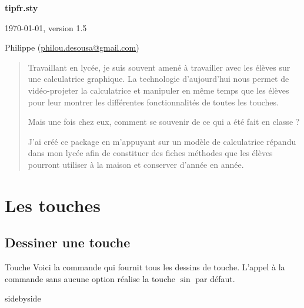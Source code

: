 \documentclass[10pt,french,a4paper]{article}
\begin{document}
\thispagestyle{empty}

\begin{center}
    \begin{tcolorbox}[enhanced,lifted shadow={1mm}{-2mm}{3mm}{0.1mm}{black!50!white},width=0.65\linewidth]
    \Huge\bfseries\centering tipfr.sty
    \end{tcolorbox}\medskip

    \Calculatrice[documentation]

    \today, version 1.5\medskip

    Philippe  (\href{mailto:philou.desousa@gmail.com}{philou.desousa@gmail.com})
\end{center}

\begin{abstract}
    Travaillant en lycée, je suis souvent amené à travailler avec les élèves sur une calculatrice graphique. La technologie d'aujourd'hui nous permet de vidéo-projeter la calculatrice et manipuler en même temps que les élèves pour leur montrer les différentes fonctionnalités de toutes les touches.\par
    Mais une fois chez eux, comment se souvenir de ce qui a été fait en classe ?\par
    J'ai créé ce package en m'appuyant sur un modèle de calculatrice répandu dans mon lycée afin de constituer des fiches méthodes que les élèves pourront utiliser à la maison et conserver d'année en année.
\end{abstract}

\tableofcontents
\vspace*{2cm}

\section{Les touches}

\subsection{Dessiner une touche}

\begin{docCommand}{Touche}{}
    Voici la commande qui fournit tous les dessins de touche. L'appel à la commande  sans aucune option réalise la touche $\sin$ par défaut.
\end{docCommand}

\begin{dispExample*}{sidebyside}
\Touche
\end{dispExample*}
\end{document}

